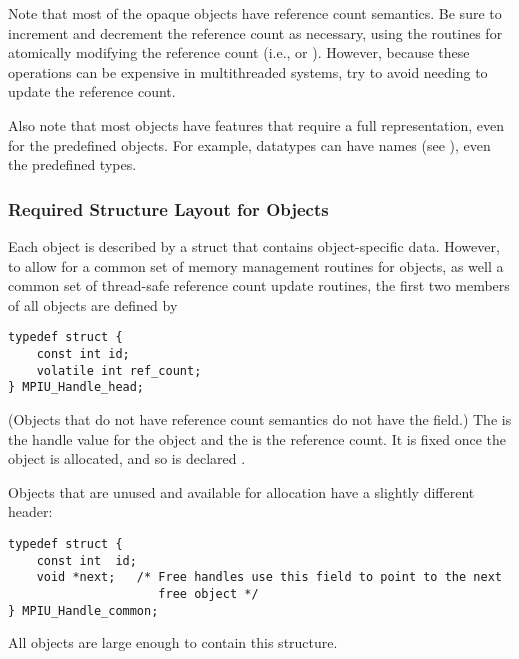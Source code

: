 \documentclass{article}
\begin{document}
Note that most of the opaque objects have reference count semantics.
Be sure to increment and decrement the reference count as necessary,
using the routines for atomically modifying the reference count (i.e.,
 or ).
However, because these operations can be expensive in multithreaded
systems, try to avoid needing to update the reference count.


Also note that most objects have features that require a full
representation, even for the predefined objects.  For example,
datatypes can have names (see ), even the
predefined types.

\subsubsection{Required Structure Layout for Objects}
Each object is described by a struct that contains object-specific
data.  However, to allow for a common set of memory management
routines for objects, as well a common set of thread-safe reference
count update routines, the first two members of all objects are
defined by
\begin{verbatim}
typedef struct {
    const int id;
    volatile int ref_count;
} MPIU_Handle_head;
\end{verbatim}
(Objects that do not have reference count semantics do not have the
 field.)  The  is the handle value for the
object and the  is the reference count.  It is fixed
once the object is allocated, and so is declared .

Objects that are unused and available for allocation have a slightly
different header:
\begin{verbatim}
typedef struct {
    const int  id;
    void *next;   /* Free handles use this field to point to the next
                     free object */
} MPIU_Handle_common;
\end{verbatim}
All objects are large enough to contain this structure.  
\end{document}
